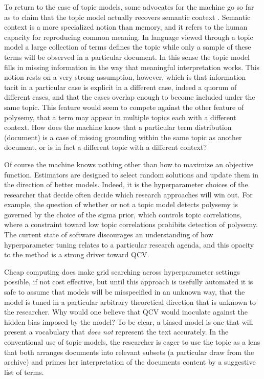 \documentclass[]{book}
\theoremstyle{definition}
\theoremstyle{definition}
\theoremstyle{definition}
\theoremstyle{remark}
\begin{document}
To return to the case of topic models, some advocates for the machine go
so far as to claim that the topic model actually recovers semantic
context \citep[578]{DiMaggio2013Exploiting}. Semantic context is a more
specialized notion than memory, and it refers to the human capacity for
reproducing common meaning. In language viewed through a topic model a
large collection of terms defines the topic while only a sample of these
terms will be observed in a particular document. In this sense the topic
model fills in missing information in the way that meaningful
interpretation works. This notion rests on a very strong assumption,
however, which is that information tacit in a particular case is
explicit in a different case, indeed a quorum of different cases, and
that the cases overlap enough to become included under the same topic.
This feature would seem to compete against the other feature of
polysemy, that a term may appear in multiple topics each with a
different context. How does the machine know that a particular term
distribution (document) is a case of missing grounding within the same
topic as another document, or is in fact a different topic with a
different context?

Of course the machine knows nothing other than how to maximize an
objective function. Estimators are designed to select random solutions
and update them in the direction of better models. Indeed, it is the
hyperparameter choices of the researcher that decide often decide which
research approaches will win out. For example, the question of whether
or not a topic model detects polysemy is governed by the choice of the
sigma prior, which controls topic correlations, where a constraint
toward low topic correlations prohibits detection of polysemy. The
current state of software discourages an understanding of how
hyperparameter tuning relates to a particular research agenda, and this
opacity to the method is a strong driver toward QCV.

Cheap computing does make grid searching across hyperparameter settings
possible, if not cost effective, but until this approach is usefully
automated it is safe to assume that models will be misspecified in an
unknown way, that the model is tuned in a particular arbitrary
theoretical direction that is unknown to the researcher. Why would one
believe that QCV would inoculate against the hidden bias imposed by the
model? To be clear, a biased model is one that will present a vocabulary
that \emph{does not} represent the text accurately. In the conventional
use of topic models, the researcher is eager to use the topic as a lens
that both arranges documents into relevant subsets (a particular draw
from the archive) and primes her interpretation of the documents content
by a suggestive list of terms.
\end{document}
